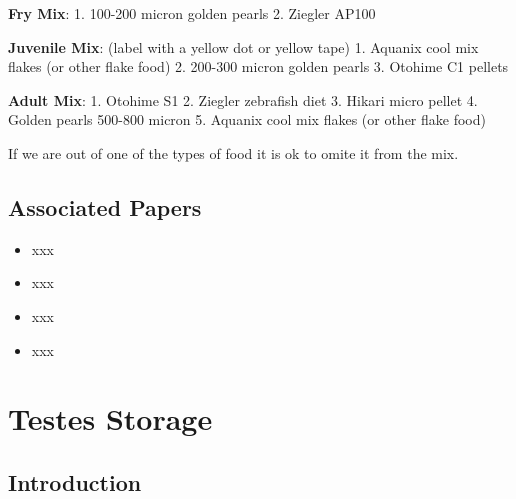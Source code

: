 \documentclass[
  letterpaper,
  DIV=11,
  numbers=noendperiod]{scrreprt}
\providecommand{\tightlist}{%
  \setlength{\itemsep}{0pt}\setlength{\parskip}{0pt}}\usepackage{longtable,booktabs,array}
\begin{document}
\textbf{Fry Mix}: 1. 100-200 micron golden pearls 2. Ziegler AP100

\textbf{Juvenile Mix}: (label with a yellow dot or yellow tape) 1.
Aquanix cool mix flakes (or other flake food) 2. 200-300 micron golden
pearls 3. Otohime C1 pellets

\textbf{Adult Mix}: 1. Otohime S1 2. Ziegler zebrafish diet 3. Hikari
micro pellet 4. Golden pearls 500-800 micron 5. Aquanix cool mix flakes
(or other flake food)

\begin{tcolorbox}[enhanced jigsaw, rightrule=.15mm, title=\textcolor{quarto-callout-note-color}{\faInfo}\hspace{0.5em}{NOTES}, titlerule=0mm, opacitybacktitle=0.6, toprule=.15mm, bottomrule=.15mm, opacityback=0, left=2mm, colframe=quarto-callout-note-color-frame, breakable, coltitle=black, colback=white, colbacktitle=quarto-callout-note-color!10!white, bottomtitle=1mm, leftrule=.75mm, toptitle=1mm, arc=.35mm]

If we are out of one of the types of food it is ok to omite it from the
mix.

\end{tcolorbox}

\hypertarget{associated-papers-34}{%
\section{Associated Papers}\label{associated-papers-34}}

\begin{itemize}
\tightlist
\item
  xxx
\item
  xxx
\item
  xxx
\item
  xxx
\end{itemize}

\hypertarget{sec-husbandry_testes_storage}{%
\chapter{Testes Storage}\label{sec-husbandry_testes_storage}}

\hypertarget{introduction-52}{%
\section{Introduction}\label{introduction-52}}
\end{document}
